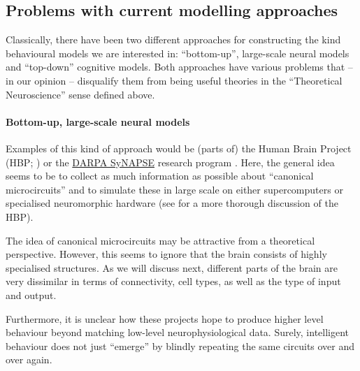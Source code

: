 \documentclass[10pt,letterpaper,oneside]{article}
\begin{document}

\subsection{Problems with current modelling approaches}

Classically, there have been two different approaches for constructing the kind behavioural models we are interested in: \enquote{bottom-up}, large-scale neural models and \enquote{top-down} cognitive models. Both approaches have various problems that -- in our opinion -- disqualify them from being useful theories in the \enquote{Theoretical Neuroscience} sense defined above.


\paragraph{Bottom-up, large-scale neural models}
Examples of this kind of approach would be (parts of) the Human Brain Project (HBP; \cite{markram2012human}) or the \href{https://www.darpa.mil/program/systems-of-neuromorphic-adaptive-plastic-scalable-electronics}{DARPA SyNAPSE} research program \cite{morgan2011darpa,merolla2014million}. Here, the general idea seems to be to collect as much information as possible about \enquote{canonical microcircuits} and to simulate these in large scale on either supercomputers or specialised neuromorphic hardware (see \cite{komer2016unified} for a more thorough discussion of the HBP).

The idea of canonical microcircuits may be attractive from a theoretical perspective. However, this seems to ignore that the brain consists of highly specialised structures. As we will discuss next, different parts of the brain are very dissimilar in terms of connectivity, cell types, as well as the type of input and output.

Furthermore, it is unclear how these projects hope to produce higher level behaviour beyond matching low-level neurophysiological data. Surely, intelligent behaviour does not just \enquote{emerge} by blindly repeating the same circuits over and over again.
\end{document}
